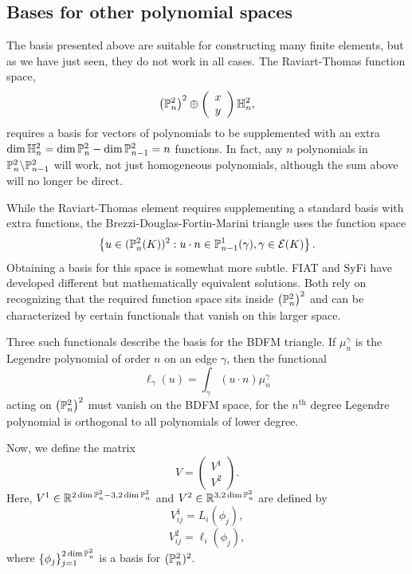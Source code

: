 \subsection{Bases for other polynomial spaces}
The basis presented above are suitable for constructing many finite
elements, but as we have just seen, they do not work in all cases.
The Raviart-Thomas function space,
\[
\left( \P^2_n \right)^2 \oplus
\left( \begin{array}{c} x \\ y \end{array} \right) \H^2_n,
\]
requires a basis for vectors of polynomials to be supplemented with
an extra \( \dim \H^2_n = \dim \P^2_n - \dim \P^2_{n-1} = n \) functions.  In fact,
any \( n \) polynomials in \( \P^2_n \backslash \P^2_{n-1} \) will
work, not just homogeneous polynomials, although the sum above will no
longer be direct.

While the Raviart-Thomas element requires supplementing a standard
basis with extra functions, the Brezzi-Douglas-Fortin-Marini triangle
uses the function space
\[
\left\{
u \in (\P^2_n (K) )^2 : u \cdot n \in \P^1_{n-1}(\gamma), \gamma \in
\mathcal{E}(K)
\right\}.
\]
Obtaining a basis for this space
is somewhat more subtle.  FIAT and SyFi have developed different
but mathematically equivalent solutions.  Both rely on recognizing that the
required function space sits inside \( \left( \P^2_n \right)^2 \) and can
be characterized by certain functionals that vanish on this larger
space.

Three such functionals describe the basis for the BDFM triangle.
If \( \mu^\gamma_n \)
is the Legendre polynomial of order \( n \) on an edge \( \gamma \),
then the functional
\[
\ell_\gamma( u ) = \int_{\gamma} (u \cdot n) \mu_n^\gamma
\]
acting on \( \left( \P^2_n \right)^2 \)
must vanish on the BDFM space, for the \( n^\mathrm{th} \) degree
Legendre polynomial is orthogonal to all polynomials of lower degree.

Now, we define the matrix
\begin{equation}
V = \left( \begin{array}{c} V^1 \\ V^2 \end{array} \right).
\end{equation}
Here, \( V^1 \in \mathbb{R}^{2 \dim \P^2_n - 3, 2\dim \P^2_n} \) and
\( V^2 \in \mathbb{R}^{3, 2 \dim \P^2_n} \) are defined
by
\[V^1_{ij} = L_i( \phi_j ),
\]
\[
V^2_{ij} = \ell_i( \phi_j ),
\]
where \( \{ \phi_j \}_{j=1}^{2 \dim{\P^2_n}} \) is a basis for \( (\P^2_n)^2
\).

